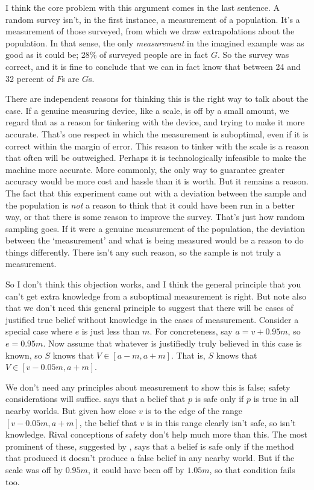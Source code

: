 {I think the core problem with this argument comes in the last sentence. A random survey isn't, in the first instance, a measurement of a population. It's a measurement of those surveyed, from which we draw extrapolations about the population. In that sense, the only \textit{measurement} in the imagined example was as good as it could be; 28\% of surveyed people are in fact $G$. So the survey was correct, and it is fine to conclude that we can in fact know that between 24 and 32 percent of $F$s are $G$s.

There are independent reasons for thinking this is the right way to talk about the case. If a genuine measuring device, like a scale, is off by a small amount, we regard that as a reason for tinkering with the device, and trying to make it more accurate. That's one respect in which the measurement is suboptimal, even if it is correct within the margin of error. This reason to tinker with the scale is a reason that often will be outweighed. Perhaps it is technologically infeasible to make the machine more accurate. More commonly, the only way to guarantee greater accuracy would be more cost and hassle than it is worth. But it remains a reason. The fact that this experiment came out with a deviation between the sample and the population is \textit{not} a reason to think that it could have been run in a better way, or that there is some reason to improve the survey. That's just how random sampling goes. If it were a genuine measurement of the population, the deviation between the `measurement' and what is being measured would be a reason to do things differently. There isn't any such reason, so the sample is not truly a measurement.

So I don't think this objection works, and I think the general principle that you can't get extra knowledge from a suboptimal measurement is right. But note also that we don't need this general principle to suggest that there will be cases of justified true belief without knowledge in the cases of measurement. Consider a special case where $e$ is just less than $m$. For concreteness, say $a = v + 0.95m$, so $e = 0.95m$. Now assume that whatever is justifiedly truly believed in this case is known, so $S$ knows that $V \in [a - m, a + m]$. That is, $S$ knows that $V \in [v - 0.05m, a + m]$.

We don't need any principles about measurement to show this is false; safety considerations will suffice. \cite{Williamson2000-WILKAI} says that a belief that $p$ is safe only if $p$ is true in all nearby worlds. But given how close $v$ is to the edge of the range $[v - 0.05m, a + m]$, the belief that $v$ is in this range clearly isn't safe, so isn't knowledge. Rival conceptions of safety don't help much more than this. The most prominent of these, suggested by \cite{Sainsbury1996}, says that a belief is safe only if the method that produced it doesn't produce a false belief in any nearby world. But if the scale was off by $0.95m$, it could have been off by $1.05m$, so that condition fails too.

}
